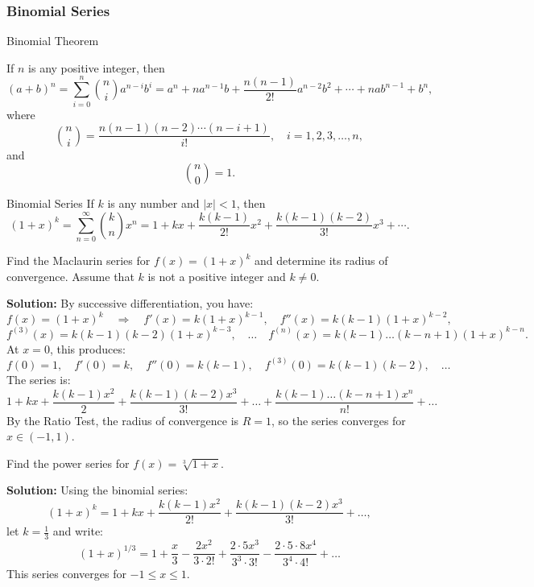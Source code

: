 \documentclass[12pt]{article}
\theoremstyle{beautifulthm}
\begin{document}
\newpage
\subsubsection{Binomial Series}

\begin{mytheorem}{Binomial Theorem}{}

If $n$ is any positive integer, then
\[
(a + b)^n = \sum_{i=0}^n \binom{n}{i} a^{n-i}b^i = a^n + na^{n-1}b + \frac{n(n-1)}{2!}a^{n-2}b^2 + \cdots + nab^{n-1} + b^n,
\]
where
\[
\binom{n}{i} = \frac{n(n-1)(n-2)\cdots(n-i+1)}{i!}, \quad i = 1, 2, 3, \dots, n,
\]
and
\[
\binom{n}{0} = 1.
\]
    
\end{mytheorem}

\begin{mytheorem}{Binomial Series}{}
   If $k$ is any number and $\lvert x \rvert < 1$, then
\[
(1 + x)^k = \sum_{n=0}^\infty \binom{k}{n}x^n = 1 + kx + \frac{k(k-1)}{2!}x^2 + \frac{k(k-1)(k-2)}{3!}x^3 + \cdots.
\] 
\end{mytheorem}


\begin{tcolorbox}[colback=examplebg, colframe=red!75!black, title=\textbf{EXAMPLE 3: Binomial Series}, fonttitle=\bfseries, sharp corners]

Find the Maclaurin series for $f(x) = (1+x)^k$ and determine its radius of convergence. Assume that $k$ is not a positive integer and $k \neq 0$.


\tcblower
\textbf{Solution:} 
By successive differentiation, you have:
\[
f(x) = (1+x)^k \quad \Rightarrow \quad f'(x) = k(1+x)^{k-1}, \quad f''(x) = k(k-1)(1+x)^{k-2},
\]
\[
f^{(3)}(x) = k(k-1)(k-2)(1+x)^{k-3}, \quad \dots \quad f^{(n)}(x) = k(k-1)\dots(k-n+1)(1+x)^{k-n}.
\]
At $x = 0$, this produces:
\[
f(0) = 1, \quad f'(0) = k, \quad f''(0) = k(k-1), \quad f^{(3)}(0) = k(k-1)(k-2), \quad \dots
\]
The series is:
\[
1 + kx + \frac{k(k-1)x^2}{2} + \frac{k(k-1)(k-2)x^3}{3!} + \dots + \frac{k(k-1)\dots(k-n+1)x^n}{n!} + \dots
\]
By the Ratio Test, the radius of convergence is $R=1$, so the series converges for $x \in (-1,1)$.
\end{tcolorbox}



\begin{tcolorbox}[colback=examplebg, colframe=red!75!black, title=\textbf{EXAMPLE 4: Finding a Binomial Series}, fonttitle=\bfseries, sharp corners]

Find the power series for $f(x) = \sqrt[3]{1+x}$.

\tcblower
\textbf{Solution:} 
Using the binomial series:
\[
(1+x)^k = 1 + kx + \frac{k(k-1)x^2}{2!} + \frac{k(k-1)(k-2)x^3}{3!} + \dots,
\]
let $k = \frac{1}{3}$ and write:
\[
(1+x)^{1/3} = 1 + \frac{x}{3} - \frac{2x^2}{3 \cdot 2!} + \frac{2 \cdot 5x^3}{3^3 \cdot 3!} - \frac{2 \cdot 5 \cdot 8x^4}{3^4 \cdot 4!} + \dots
\]
This series converges for $-1 \leq x \leq 1$.
\end{tcolorbox}
\newpage
\end{document}
